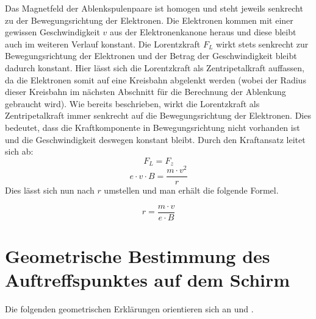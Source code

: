 Das Magnetfeld der Ablenkspulenpaare ist homogen und steht jeweils senkrecht zu der Bewegungsrichtung der Elektronen.
Die Elektronen kommen mit einer gewissen Geschwindigkeit $v$ aus der Elektronenkanone heraus und diese bleibt auch im weiteren Verlauf konstant.
Die Lorentzkraft $F_L$ wirkt stets senkrecht zur Bewegungsrichtung der Elektronen und der Betrag der Geschwindigkeit bleibt dadurch konstant.
Hier lässt sich die Lorentzkraft als Zentripetalkraft auffassen, da die Elektronen somit auf eine Kreisbahn abgelenkt werden (wobei der Radius dieser Kreisbahn im nächsten Abschnitt für die Berechnung der Ablenkung gebraucht wird).
Wie bereits beschrieben, wirkt die Lorentzkraft als Zentripetalkraft immer senkrecht auf die Bewegungsrichtung der Elektronen.
Dies bedeutet, dass die Kraftkomponente in Bewegungsrichtung nicht vorhanden ist und die Geschwindigkeit deswegen konstant bleibt.
Durch den Kraftansatz leitet sich ab: 
\begin{equation}
\label{eq:Kraft}
   F_L=F_z 
\end{equation}
$$ e \cdot v \cdot B = \frac{m \cdot v^2}{r}$$
Dies lässt sich nun nach $r$ umstellen und man erhält die folgende Formel.   


\begin{equation*}
     r = \frac{m \cdot v}{e \cdot B}
\end{equation*}

\section{Geometrische Bestimmung des Auftreffspunktes auf dem Schirm}
\label{sec:g}
Die folgenden geometrischen Erklärungen orientieren sich an \cite{Blog} und \cite{Gente1950}.

